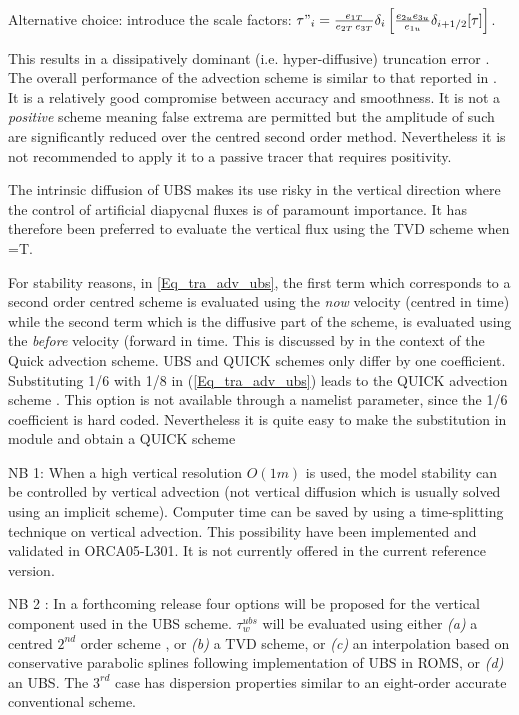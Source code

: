 \documentclass[NEMO_book]{subfiles}
\begin{document}
Alternative choice: introduce the scale factors:  
$\tau "_i =\frac{e_{1T}}{e_{2T}\,e_{3T}}\delta _i \left[ \frac{e_{2u} e_{3u} }{e_{1u} }\delta _{i+1/2}[\tau] \right]$.


This results in a dissipatively dominant (i.e. hyper-diffusive) truncation 
error \citep{Shchepetkin_McWilliams_OM05}. The overall performance of the 
advection scheme is similar to that reported in \cite{Farrow1995}. 
It is a relatively good compromise between accuracy and smoothness. It is 
not a \emph{positive} scheme meaning false extrema are permitted but the 
amplitude of such are significantly reduced over the centred second order 
method. Nevertheless it is not recommended to apply it to a passive tracer 
that requires positivity. 

The intrinsic diffusion of UBS makes its use risky in the vertical direction 
where the control of artificial diapycnal fluxes is of paramount importance. 
It has therefore been preferred to evaluate the vertical flux using the TVD 
scheme when =T.

For stability reasons, in \eqref{Eq_tra_adv_ubs}, the first term which corresponds 
to a second order centred scheme is evaluated using the \textit{now} velocity 
(centred in time) while the second term which is the diffusive part of the scheme, 
is evaluated using the \textit{before} velocity (forward in time. This is discussed 
by \citet{Webb_al_JAOT98} in the context of the Quick advection scheme. UBS and QUICK 
schemes only differ by one coefficient. Substituting 1/6 with 1/8 in 
(\ref{Eq_tra_adv_ubs}) leads to the QUICK advection scheme \citep{Webb_al_JAOT98}. 
This option is not available through a namelist parameter, since the 1/6 
coefficient is hard coded. Nevertheless it is quite easy to make the 
substitution in  module and obtain a QUICK scheme

NB 1: When a high vertical resolution $O(1m)$ is used, the model stability can 
be controlled by vertical advection (not vertical diffusion which is usually 
solved using an implicit scheme). Computer time can be saved by using a 
time-splitting technique on vertical advection. This possibility have been 
implemented and validated in ORCA05-L301. It is not currently offered in the 
current reference version. 

NB 2 : In a forthcoming release four options will be proposed for the 
vertical component used in the UBS scheme. $\tau _w^{ubs}$ will be 
evaluated using either \textit{(a)} a centred $2^{nd}$ order scheme , 
or  \textit{(b)} a TVD scheme, or  \textit{(c)} an interpolation based on conservative 
parabolic splines following \citet{Shchepetkin_McWilliams_OM05} implementation of UBS in ROMS, 
or  \textit{(d)} an UBS. The $3^{rd}$ case has dispersion properties similar to an 
eight-order accurate conventional scheme.
\end{document}
